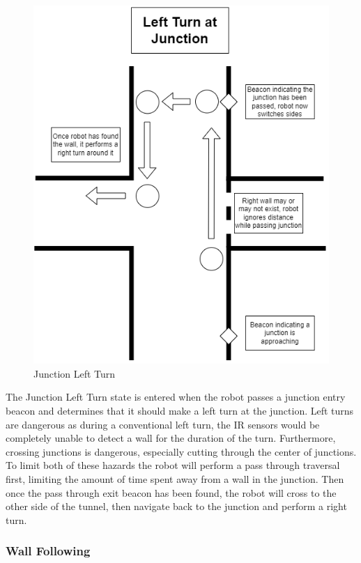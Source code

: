 \documentclass[12pt]{report}
\begin{document}
\begin{figure}[H]
\caption{Junction Left Turn}
\centering
\includegraphics[scale=0.55]{images/Junction Diagrams Left Turn.png}
\centering
\end{figure}

The Junction Left Turn state is entered when the robot passes a junction entry beacon and determines that it should make a left turn at the junction. Left turns are dangerous as during a conventional left turn, the IR sensors would be completely unable to detect a wall for the duration of the turn. Furthermore, crossing junctions is dangerous, especially cutting through the center of junctions. To limit both of these hazards the robot will perform a pass through traversal first, limiting the amount of time spent away from a wall in the junction. Then once the pass through exit beacon has been found, the robot will cross to the other side of the tunnel, then navigate back to the junction and perform a right turn.



\subsubsection{Wall Following}
\end{document}
